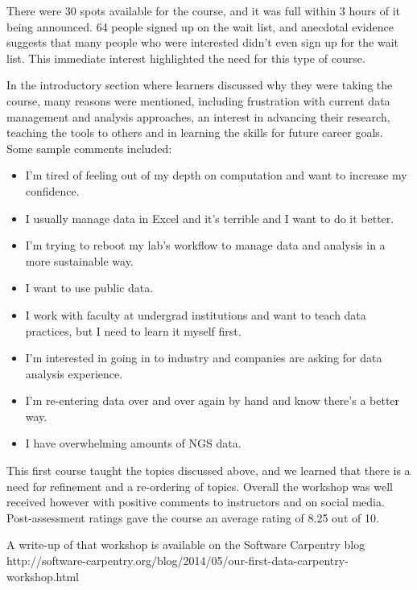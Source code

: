 \documentclass[11pt]{article}
\begin{document}
There were 30 spots available for the course, and it was full within 3 hours of it being announced. 64 people signed up on the wait list, and anecdotal evidence suggests that many people who were interested didn't even sign up for the wait list. This immediate interest highlighted the need for this type of course.

In the introductory section where learners discussed why they were taking the course, many reasons were mentioned, including frustration with current data management and analysis approaches, an interest in advancing their research, teaching the tools to others and in learning the skills for future career goals. Some sample comments included:

\begin{itemize}
\item I'm tired of feeling out of my depth on computation and want to increase my confidence.
\item I usually manage data in Excel and it's terrible and I want to do it better.
\item I'm trying to reboot my lab's workflow to manage data and analysis in a more sustainable way.
\item I want to use public data.
\item I work with faculty at undergrad institutions and want to teach data practices, but I need to learn it myself first.
\item I'm interested in going in to industry and companies are asking for data analysis experience.
\item I'm re-entering data over and over again by hand and know there's a better way.
\item I have overwhelming amounts of NGS data.
\end{itemize}

This first course taught the topics discussed above, and we learned that there is a need for refinement and a 
re-ordering of topics. Overall the workshop was well received however with positive comments to instructors and on social media. Post-assessment ratings gave the course an average rating of 8.25 out of 10.

A write-up of that workshop is available on the Software Carpentry blog
\\http://software-carpentry.org/blog/2014/05/our-first-data-carpentry-workshop.html
\end{document}
